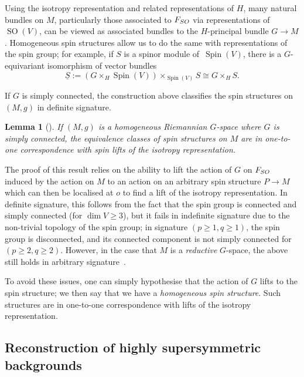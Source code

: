 \documentclass[11pt]{article}
\numberwithin{equation}{section}
\numberwithin{equation}{section}
\newtheorem{Lemma}[Theorem]{Lemma}
\newcommand{\Sbundle}{\underline{S}}
\newcommand{\1}{\mathbbm{1}}
\DeclareMathOperator{\Spin}{Spin}
\DeclareMathOperator{\SO}{SO}
\begin{document}
Using the isotropy representation and related representations of $H$, many natural bundles on $M$, particularly those associated to $F_{\rm SO}$ via representations of $\SO(V)$, can be viewed as associated bundles to the $H$-principal bundle $G\to M$. Homogeneous spin structures allow us to do the same with representations of the spin group; for example, if $S$ is a spinor module of~$\Spin(V)$, there is a $G$-equivariant isomorphism of vector bundles
\[
	\Sbundle := (G\times_H\Spin(V))\times_{\Spin(V)} S \cong G\times_H S.
\]

If $G$ is simply connected, the construction above classifies the spin structures on $(M,g)$ in definite signature.

\begin{Lemma}[\cite{Bar1992,Cahen1993}]\label{lemma:homogeneous-spin}
	If $(M,g)$ is a homogeneous Riemannian $G$-space where $G$ is simply connected, the equivalence classes of spin structures on $M$ are in one-to-one correspondence with spin lifts of the isotropy representation.
\end{Lemma}

The proof of this result relies on the ability to lift the action of $G$ on $F_{\rm SO}$ induced by the action on $M$ to an action on an arbitrary spin structure $P\to M$ which can then be localised at $o$ to find a lift of the isotropy representation. In definite signature, this follows from the fact that the spin group is connected and simply connected (for $\dim V \geq 3$), but it fails in indefinite signature due to the non-trivial topology of the spin group; in signature $(p\geq 1,q\geq 1)$, the spin group is disconnected, and its connected component is not simply connected for $(p\geq 2,q\geq 2)$. However, in the case that $M$ is a \emph{reductive} $G$-space, the above still holds in arbitrary signature~\cite{Alekseevsky2019,Cahen1993}.

To avoid these issues, one can simply hypothesise that the action of $G$ lifts to the spin structure; we then say that we have a \emph{homogeneous spin structure}. Such structures are in one-to-one correspondence with lifts of the isotropy representation.

\subsection{Reconstruction of highly supersymmetric backgrounds}
\label{sec:high-susy-spin-mfld-homogeneous}
\end{document}
